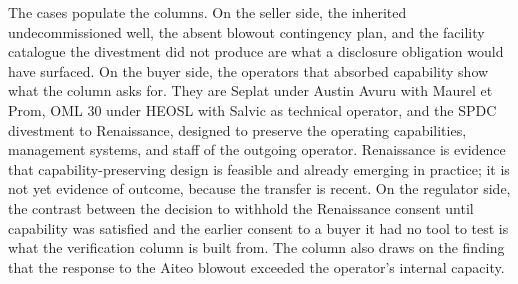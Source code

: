 The cases populate the columns. On the seller side, the inherited
undecommissioned well, the absent blowout contingency plan, and the
facility catalogue the divestment did not produce are what a disclosure
obligation would have surfaced. On the buyer side, the operators that
absorbed capability show what the column asks for. They are Seplat under
Austin Avuru with Maurel et Prom, OML 30 under HEOSL with Salvic as
technical operator, and the SPDC divestment to Renaissance, designed to
preserve the operating capabilities, management systems, and staff of
the outgoing operator. Renaissance is evidence that
capability-preserving design is feasible and already emerging in
practice; it is not yet evidence of outcome, because the transfer is
recent. On the regulator side, the contrast between the decision to
withhold the Renaissance consent until capability was satisfied and the
earlier consent to a buyer it had no tool to test is what the
verification column is built from. The column also draws on the finding
that the response to the Aiteo blowout exceeded the operator's internal
capacity.

